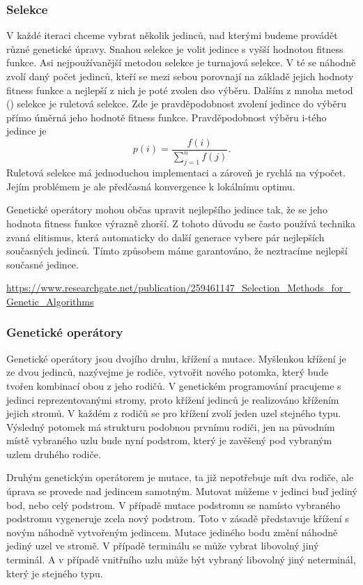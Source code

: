 \subsubsection{Selekce}
V každé iteraci chceme vybrat několik jedinců, nad kterými budeme provádět různé genetické úpravy. Snahou selekce je volit jedince s vyšší hodnotou fitness funkce.
Asi nejpoužívanější metodou selekce je turnajová selekce. V té se náhodně zvolí daný počet jedinců, kteří se mezi sebou porovnají na základě jejich hodnoty fitness funkce a nejlepší z nich je poté zvolen dso výběru.
Dalším z mnoha metod (\cite{selekcniMetody}) selekce je ruletová selekce. Zde je pravděpodobnost zvolení jedince do výběru přímo úměrná jeho hodnotě fitness funkce.
Pravděpodobnost výběru i-tého jedince je 
\[p(i) = \frac{f(i)}{\sum_{j=1}^{n} f(j)}. \]
Ruletová selekce má jednoduchou implementaci a zároveň je rychlá na výpočet. 
Jejím problémem je ale předčasná konvergence k lokálnímu optimu.
\par
Genetické operátory mohou občas upravit nejlepšího jedince tak, že se jeho hodnota fitness funkce výrazně zhorší.
Z tohoto důvodu se často používá technika zvaná elitismus, která automaticky do další generace vybere pár nejlepších současných jedinců. 
Tímto způsobem máme garantováno, že neztracíme nejlepší současné jedince.

\url{https://www.researchgate.net/publication/259461147_Selection_Methods_for_Genetic_Algorithms}


\subsubsection{Genetické operátory}
Genetické operátory jsou dvojího druhu, křížení a mutace. Myšlenkou křížení je ze dvou jedinců, nazývejme je rodiče, vytvořit nového potomka, který bude tvořen kombinací obou z jeho rodičů.
V genetickém programování pracujeme s jedinci reprezentovanými stromy, proto křížení jedinců je realizováno křížením jejich stromů. V každém z rodičů se pro křížení zvolí jeden uzel stejného typu. 
Výsledný potomek má strukturu podobnou prvnímu rodiči, jen na původním místě vybraného uzlu bude nyní podstrom, který je zavěšený pod vybraným uzlem druhého rodiče.
\par
Druhým genetickým operátorem je mutace, ta již nepotřebuje mít dva rodiče, ale úprava se provede nad jedincem samotným.
Mutovat můžeme v jedinci buď jediný bod, nebo celý podstrom. V případě mutace podstromu se namísto vybraného podstromu vygeneruje zcela nový podstrom. 
Toto v zásadě představuje křížení s novým náhodně vytvořeným jedincem.
\newline
Mutace jediného bodu změní náhodně jediný uzel ve stromě. V případě terminálu se může vybrat libovolný jiný terminál. A v případě vnitřního uzlu může být vybraný libovolný jiný neterminál, který je stejného typu.


